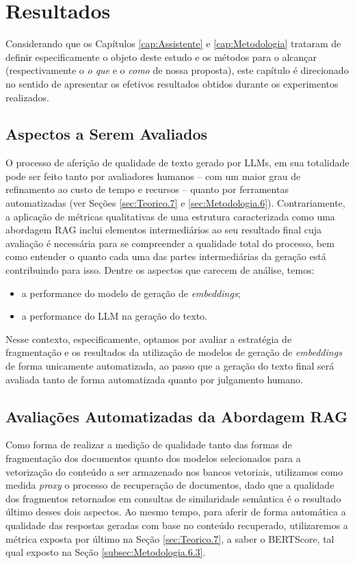 \chapter{Resultados}
\label{cap:Resultados}

Considerando que os Capítulos \ref{cap:Assistente} e \ref{cap:Metodologia} trataram de definir especificamente o objeto deste estudo e os métodos para o alcançar (respectivamente o \textit{o que} e o \textit{como} de nossa proposta), este capítulo é direcionado no sentido de apresentar os efetivos resultados obtidos durante os experimentos realizados.

\section{Aspectos a Serem Avaliados}
\label{sec:Resultados.1}
O processo de aferição de qualidade de texto gerado por \ac{LLM}s, em sua totalidade pode ser feito tanto por avaliadores humanos -- com um maior grau de refinamento ao custo de tempo e recursos -- quanto por ferramentas automatizadas (ver Seções \ref{sec:Teorico.7} e \ref{sec:Metodologia.6}). Contrariamente, a aplicação de métricas qualitativas de uma estrutura caracterizada como uma abordagem \ac{RAG} inclui elementos intermediários ao seu resultado final cuja avaliação é necessária para se compreender a qualidade total do processo, bem como entender o quanto cada uma das partes intermediárias da geração está contribuindo para isso. Dentre os aspectos que carecem de análise, temos:

\begin{itemize}
    \item a performance do modelo de geração de \textit{embeddings};
    \item a performance do \ac{LLM} na geração do texto.
\end{itemize}

Nesse contexto, especificamente, optamos por avaliar a estratégia de fragmentação e os resultados da utilização de modelos de geração de \textit{embeddings} de forma unicamente automatizada, ao passo que a geração do texto final será avaliada tanto de forma automatizada quanto por julgamento humano.

\section{Avaliações Automatizadas da Abordagem RAG}
\label{sec:Resultados.2}
Como forma de realizar a medição de qualidade tanto das formas de fragmentação dos documentos quanto dos modelos selecionados para a vetorização do conteúdo a ser armazenado nos bancos vetoriais, utilizamos como medida \textit{proxy} o processo de recuperação de documentos, dado que a qualidade dos fragmentos retornados em consultas de similaridade semântica é o resultado último desses dois aspectos. Ao mesmo tempo, para aferir de forma automática a qualidade das respostas geradas com base no conteúdo recuperado, utilizaremos a métrica exposta por último na Seção \ref{sec:Teorico.7}, a saber o BERTScore, tal qual exposto na Seção \ref{subsec:Metodologia.6.3}.

